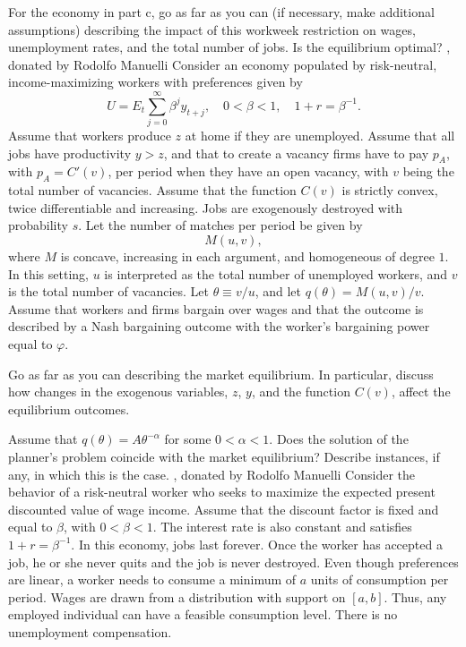 For the economy in part c, go as far as you can (if necessary, make
additional assumptions) describing the impact of this workweek restriction on wages,
unemployment rates, and the total number of jobs.  Is the equilibrium optimal?
\medskip
{} , donated by Rodolfo Manuelli
\medskip \noindent
Consider an economy populated by risk-neutral, income-maximizing workers with
preferences given by
$$ U = E_t \sum_{j=0}^\infty \beta^j y_{t+j}, \quad
0 < \beta < 1, \quad
1 + r = \beta^{-1}.  $$
Assume that workers produce $z$ at home if they are unemployed.  Assume that
 all jobs have productivity $y>z$, and that to create a vacancy firms
have to pay $p_A$, with $p_A = C'(v)$, per period when they have an open
 vacancy, with $v$ being the total number of vacancies.  Assume that the
function $C(v)$ is strictly convex, twice differentiable and increasing.
  Jobs are exogenously destroyed with probability $s$.
\medskip
\noindent
Let the number of matches per period be given by
$$ M(u,v),  $$
where $M$ is concave, increasing in each argument, and homogeneous
 of degree $1$.  In this setting, $u$ is interpreted as the total
number of unemployed workers, and $v$ is the total number of vacancies.
Let $\theta \equiv v/u$, and let $q(\theta) = M(u,v)/v$.
\medskip
\noindent
Assume that workers and firms bargain over wages and that the outcome is
described by a Nash bargaining outcome with the worker's bargaining power
equal to $\varphi$.
\medskip

 Go as far as you can describing the market equilibrium.
In particular, discuss how changes in the exogenous variables, $z$, $y$, and
the function $C(v)$, affect the equilibrium outcomes.
\medskip

 Assume that $q(\theta) = A \theta^{-\alpha}$ for some  $0 < \alpha < 1$.
Does the solution of the planner's problem coincide with  the market equilibrium?
Describe instances, if any, in which this is the case.
\vfil\eject
\medskip
{} , donated by Rodolfo Manuelli
\medskip \noindent
Consider the behavior of a risk-neutral worker who seeks to maximize the expected
present discounted value of wage income.  Assume that the discount factor is fixed
and equal to $\beta$, with $0<\beta<1$.  The interest rate is also constant and
satisfies $1+r=\beta^{-1}$.  In this economy, jobs last  forever.  Once the worker
has accepted a job, he or she never quits and the job is never destroyed.  Even though
preferences are linear, a worker needs to consume a minimum of $a$ units of
consumption per period.  Wages are drawn from a distribution with support
on $[a,b]$.  Thus, any employed individual can have a feasible consumption
level.  There is no unemployment compensation.

